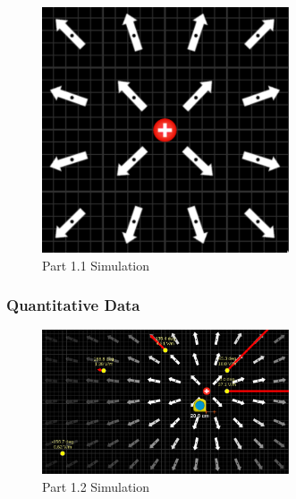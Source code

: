 \documentclass{article}
\begin{document}
\begin{figure}[H]
	\begin{center}
		\includegraphics[width=0.65\textwidth]{part-1-simulation.pdf} %
		\caption{Part 1.1 Simulation}
	\end{center}
\end{figure}

\subsubsection{Quantitative Data}%
\label{ssub:quantitative_data}

\begin{figure}[H]
	\begin{center}
		\includegraphics[width=0.65\textwidth]{part-2-simulation.pdf} %
		\caption{Part 1.2 Simulation}
	\end{center}
\end{figure}
\end{document}
